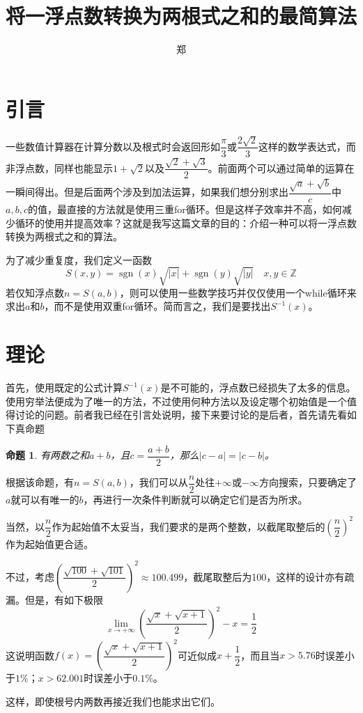 \documentclass[a4paper, UTF8]{ctexart}
\title{将一浮点数转换为两根式之和的最简算法}
\author{郑}
\newtheorem{proposition}{命题}
\DeclareMathOperator{\sgn}{\mathrm{sgn}}
\begin{document}
\maketitle

\section{引言}
一些数值计算器在计算分数以及根式时会返回形如$\dfrac{\pi}{3}$或$\dfrac{2\sqrt{2}}{3}$这样的数学表达式，而非浮点数，同样也能显示$1+\sqrt{2}$以及$\dfrac{\sqrt{2}+\sqrt{3}}{2}$。前面两个可以通过简单的运算在一瞬间得出。但是后面两个涉及到加法运算，如果我们想分别求出$\dfrac{\sqrt{a}+\sqrt{b}}{c}$中$a,b,c$的值，最直接的方法就是使用三重for循环。但是这样子效率并不高，如何减少循环的使用并提高效率？这就是我写这篇文章的目的：介绍一种可以将一浮点数转换为两根式之和的算法。

为了减少重复度，我们定义一函数\[S(x,y)=\sgn(x)\sqrt{|x|}+\sgn(y)\sqrt{|y|} \quad x,y\in\mathbb{Z}\]若仅知浮点数$n=S(a,b)$，则可以使用一些数学技巧并仅仅使用一个while循环来求出$a$和$b$，而不是使用双重for循环。简而言之，我们是要找出$S^{-1}(x)$。

\section{理论}
首先，使用既定的公式计算$S^{-1}(x)$是不可能的，浮点数已经损失了太多的信息。使用穷举法便成为了唯一的方法，不过使用何种方法以及设定哪个初始值是一个值得讨论的问题。前者我已经在引言处说明，接下来要讨论的是后者，首先请先看如下真命题
\begin{proposition}
    有两数之和$a+b$，且$c=\dfrac{a+b}{2}$，那么$|c-a|=|c-b|$。
\end{proposition}
根据该命题，有$n=S(a,b)$，我们可以从$\dfrac{n}{2}$处往$+\infty$或$-\infty$方向搜索，只要确定了$a$就可以有唯一的$b$，再进行一次条件判断就可以确定它们是否为所求。

当然，以$\dfrac{n}{2}$作为起始值不太妥当，我们要求的是两个整数，以截尾取整后的$\left(\dfrac{n}{2}\right)^2$作为起始值更合适。

不过，考虑$\left(\dfrac{\sqrt{100}+\sqrt{101}}{2}\right)^2\approx100.499$，截尾取整后为100，这样的设计亦有疏漏。但是，有如下极限\[\lim_{x\to+\infty} \left(\frac{\sqrt{x}+\sqrt{x+1}}{2}\right)^2-x=\frac{1}{2}\]这说明函数$f(x)=\left(\dfrac{\sqrt{x}+\sqrt{x+1}}{2}\right)^2$可近似成$x+\dfrac{1}{2}$，而且当$x>5.76$时误差小于$1\%$；$x>62.001$时误差小于$0.1\%$。

这样，即使根号内两数再接近我们也能求出它们。
\end{document}
